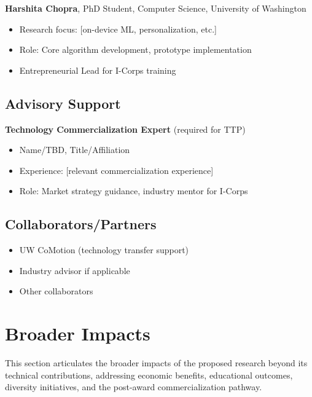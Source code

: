 \documentclass[11pt]{article}
\begin{document}
\noindent
\textbf{Harshita Chopra}, PhD Student, Computer Science, University of Washington
\begin{itemize}[noitemsep]
    \item Research focus: [on-device ML, personalization, etc.]
    \item Role: Core algorithm development, prototype implementation
    \item Entrepreneurial Lead for I-Corps training
\end{itemize}

\subsection{Advisory Support}
\textbf{Technology Commercialization Expert} (required for TTP)
\begin{itemize}[noitemsep]
    \item Name/TBD, Title/Affiliation
    \item Experience: [relevant commercialization experience]
    \item Role: Market strategy guidance, industry mentor for I-Corps
\end{itemize}

\subsection{Collaborators/Partners}
\begin{itemize}[noitemsep]
    \item UW CoMotion (technology transfer support)
    \item Industry advisor if applicable
    \item Other collaborators
\end{itemize}

\vspace*{-8pt}
\section{Broader Impacts}
\label{sec:impacts}
\vspace*{-8pt}
This section articulates the broader impacts of the proposed research beyond its 
technical contributions, addressing economic benefits, educational outcomes, 
diversity initiatives, and the post-award commercialization pathway.

\vspace*{-8pt}
\end{document}
